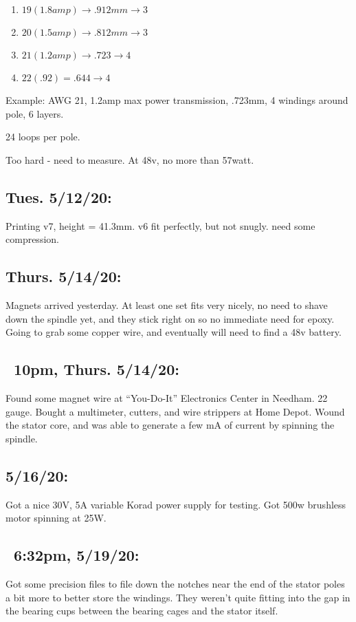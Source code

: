 \documentclass[11pt]{article} %
\begin{document}
\begin{enumerate}
\item $19 (1.8amp) \rightarrow .912mm \rightarrow 3$
\item $20 (1.5amp) \rightarrow .812mm \rightarrow 3$
\item $21 (1.2amp) \rightarrow .723 \rightarrow 4$
\item $22 (.92) = .644 \rightarrow 4$
\end{enumerate}

Example: AWG 21, 1.2amp max power transmission, .723mm, 4 windings around pole, 6 layers.

24 loops per pole.

Too hard - need to measure. At 48v, no more than 57watt.

\subsection{Tues. 5/12/20:} Printing v7, height = 41.3mm. v6 fit perfectly, but not snugly. need some compression.

\subsection{Thurs. 5/14/20:} Magnets arrived yesterday. At least one set fits very nicely, no need to shave down the spindle yet, and they stick right on so no immediate need for epoxy. Going to grab some copper wire, and eventually will need to find a 48v battery.





\subsection{~10pm, Thurs. 5/14/20:} Found some magnet wire at “You-Do-It” Electronics Center in Needham. 22 gauge. Bought a multimeter, cutters, and wire strippers at Home Depot. Wound the stator core, and was able to generate a few mA of current by spinning the spindle.




\subsection{5/16/20:} Got a nice 30V, 5A variable Korad power supply for testing. Got 500w brushless motor spinning at 25W.



\subsection{~6:32pm, 5/19/20:} Got some precision files to file down the notches near the end of the stator poles a bit more to better store the windings. They weren’t quite fitting into the gap in the bearing cups between the bearing cages and the stator itself. 
\end{document}
